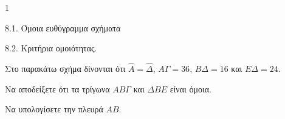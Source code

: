 \begin{ylh}{1}
    \item 8.1. Όμοια ευθύγραμμα σχήματα
    \item 8.2. Κριτήρια ομοιότητας.
\end{ylh}
\begin{figure}
    \centering
\end{figure}
Στο παρακάτω σχήμα δίνονται ότι $\hat{A} = \hat{\Delta}$, $A\Gamma = 36$, $B\Delta = 16$ και $E\Delta = 24$.
\begin{alist}
\item Να αποδείξετε ότι τα τρίγωνα $AB\Gamma$ και $\Delta BE$ είναι όμοια. 
\item Να υπολογίσετε την πλευρά $AB$. 
\end{alist}
